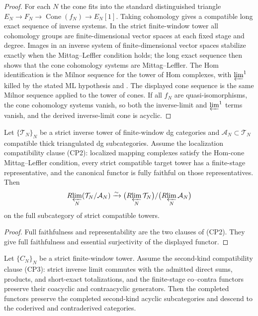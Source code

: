 \begin{proof}
For each $N$ the cone fits into the standard distinguished triangle
$E_N\to F_N\to\operatorname{Cone}(f_N)\to E_N[1]$.  Taking cohomology
gives a compatible long exact sequence of inverse systems.  In the
strict finite-window tower all cohomology groups are finite-dimensional
vector spaces at each fixed stage and degree.  Images in an inverse
system of finite-dimensional vector spaces stabilize exactly when the
Mittag--Leffler condition holds; the long exact sequence then shows
that the cone cohomology systems are Mittag--Leffler. The Hom
identification is the Milnor sequence for the tower of Hom complexes,
with $\varprojlim^1$ killed by the stated ML hypothesis and
\cite[Prop.~3.5.7]{Weibel94}. The displayed cone sequence is the
same Milnor sequence applied to the tower of cones. If all $f_N$ are
quasi-isomorphisms, the cone cohomology systems vanish, so both the
inverse-limit and $\varprojlim^1$ terms vanish, and the derived
inverse-limit cone is acyclic.
\end{proof}

\begin{proposition}
\label{prop:strict-rlim-verdier-quotient}
\label{lem:strict-rlim-verdier-quotient}
Let \(\{\mathcal T_N\}_N\) be a strict inverse tower of finite-window
dg categories and
\(\mathcal A_N\subset\mathcal T_N\) compatible thick triangulated dg
subcategories.  Assume the localization compatibility clause
\textup{(CP2)}: localized mapping complexes satisfy the Hom-cone
Mittag--Leffler condition, every strict compatible target tower has a
finite-stage representative, and the canonical functor is fully
faithful on those representatives.  Then
\[
 R\!\varprojlim_N(\mathcal T_N/\mathcal A_N)
 \xrightarrow{\sim}
 \bigl(R\!\varprojlim_N\mathcal T_N\bigr)/
 \bigl(R\!\varprojlim_N\mathcal A_N\bigr)
\]
on the full subcategory of strict compatible towers.
\end{proposition}

\begin{proof}
Full faithfulness and representability are the two clauses of
\textup{(CP2)}.  They give full faithfulness and essential
surjectivity of the displayed functor.
\end{proof}

\begin{proposition}
\label{prop:completed-second-kind-generator-preservation}
Let \(\{C_N\}_N\) be a strict finite-window tower.  Assume the
second-kind compatibility clause \textup{(CP3)}: strict inverse limit
commutes with the admitted direct sums, products, and short-exact
totalizations, and the finite-stage co--contra functors preserve their
coacyclic and contraacyclic generators.  Then the completed functors
preserve the completed second-kind acyclic subcategories and descend
to the coderived and contraderived categories.
\end{proposition}


